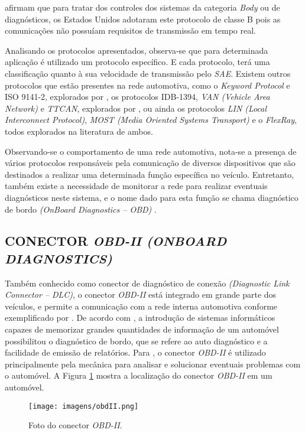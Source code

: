  afirmam que para tratar dos controles dos sistemas da categoria \textit{Body} ou de diagnósticos, os Estados Unidos adotaram este protocolo de classe B pois as comunicações não possuíam requisitos de transmissão em tempo real.

Analisando os protocolos apresentados, observa-se que para determinada aplicação é utilizado um protocolo específico.  E cada protocolo, terá uma classificação quanto à sua velocidade de transmissão pelo \textit{SAE}. Existem outros protocolos que estão presentes na rede automotiva, como o \textit{Keyword Protocol} e ISO 9141-2, explorados por , os protocolos IDB-1394, \textit{VAN (Vehicle Area Network)} e \textit{TTCAN}, explorados por , ou ainda os protocolos \textit{LIN (Local Interconnect Protocol)}, \textit{MOST (Media Oriented Systems Transport)} e o \textit{FlexRay}, todos explorados na literatura de ambos.

Observando-se o comportamento de uma rede automotiva, nota-se a presença de vários protocolos responsáveis pela comunicação de diversos dispositivos que são destinados a realizar uma determinada função específica no veículo. Entretanto, também existe a necessidade de monitorar a rede para realizar eventuais diagnósticos neste sistema, e o nome dado para esta função se chama diagnóstico de bordo \textit{(OnBoard Diagnostics – OBD)} \cite{navetsimonotlion}.

\subsection{CONECTOR \textit{OBD-II (ONBOARD DIAGNOSTICS)}}\label{subsecaoobd}
Também conhecido como conector de diagnóstico de conexão \textit{(Diagnostic Link Connector – DLC)}, o conector \textit{OBD-II} está integrado em grande parte dos veículos, e permite a comunicação com a rede interna automotiva conforme exemplificado por . De acordo com , a introdução de sistemas informáticos capazes de memorizar grandes quantidades de informação de um automóvel possibilitou o diagnóstico de bordo, que se refere ao auto diagnóstico e a facilidade de emissão de relatórios. Para , o conector \textit{OBD-II} é utilizado principalmente pela mecânica para analisar e solucionar eventuais problemas com o automóvel. A Figura \ref{Fig:obd2} mostra a localização do conector \textit{OBD-II} em um automóvel.

\begin{figure}[!ht]
\centering
\caption{Foto do conector \textit{OBD-II}.} 
{\texttt{[image: imagens/obdII.png]}}\\
 \label{Fig:obd2}
\end{figure}

